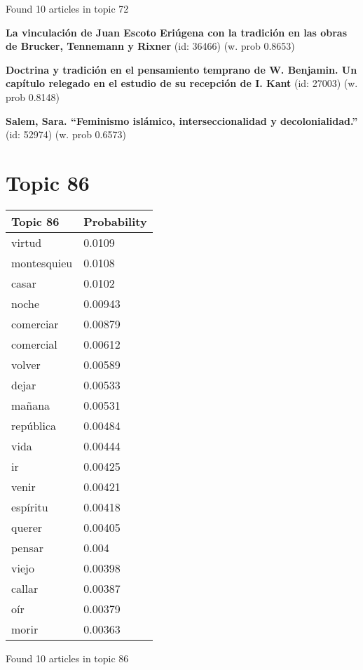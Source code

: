 \documentclass{article}
\begin{document}
\vfill
Found 10 articles in topic 72
\vfill

\textbf{La vinculación de Juan Escoto Eriúgena con la tradición en las obras de Brucker, Tennemann y Rixner} (id: 36466)
 (w. prob 0.8653)
\vfill

\textbf{Doctrina y tradición en el pensamiento temprano de W. Benjamin. Un capítulo relegado en el estudio de su recepción de I. Kant} (id: 27003)
 (w. prob 0.8148)
\vfill

\textbf{Salem, Sara. “Feminismo islámico, interseccionalidad y decolonialidad.”} (id: 52974)
 (w. prob 0.6573)

\vfill
\newpage


\centering
\thispagestyle{empty}
\section*{Topic 86}\vfill
\begin{tabular}{ll}
\toprule
    Topic 86 & Probability \\
\midrule
      virtud &      0.0109 \\
 montesquieu &      0.0108 \\
       casar &      0.0102 \\
       noche &     0.00943 \\
   comerciar &     0.00879 \\
   comercial &     0.00612 \\
      volver &     0.00589 \\
       dejar &     0.00533 \\
      mañana &     0.00531 \\
   república &     0.00484 \\
        vida &     0.00444 \\
          ir &     0.00425 \\
       venir &     0.00421 \\
    espíritu &     0.00418 \\
      querer &     0.00405 \\
      pensar &       0.004 \\
       viejo &     0.00398 \\
      callar &     0.00387 \\
         oír &     0.00379 \\
       morir &     0.00363 \\
\bottomrule
\end{tabular}

\vfill
Found 10 articles in topic 86
\vfill
\end{document}
